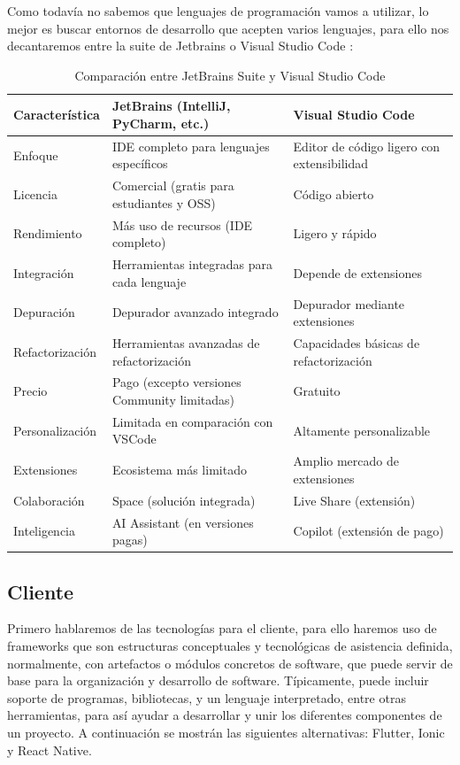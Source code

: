 Como todavía no sabemos que lenguajes de programación vamos a utilizar, lo mejor es buscar entornos de desarrollo que acepten varios lenguajes, para ello nos decantaremos entre la suite de Jetbrains \cite{jetbrains} o Visual Studio Code \cite{vscode}:

\begin{table}[H]
	\centering

	\begin{tabular}{|>{\raggedright}p{3cm}|p{4cm}|p{4cm}|} 
		\hline
		\textbf{Característica} & \textbf{JetBrains (IntelliJ, PyCharm, etc.)} & \textbf{Visual Studio Code} \\ \hline
		Enfoque & IDE completo para lenguajes específicos & Editor de código ligero con extensibilidad \\ \hline
		Licencia & Comercial (gratis para estudiantes y OSS) & Código abierto \\ \hline
		Rendimiento & Más uso de recursos (IDE completo) & Ligero y rápido \\ \hline
		Integración & Herramientas integradas para cada lenguaje & Depende de extensiones \\ \hline
		Depuración & Depurador avanzado integrado & Depurador mediante extensiones \\ \hline
		Refactorización & Herramientas avanzadas de refactorización & Capacidades básicas de refactorización \\ \hline
		Precio & Pago (excepto versiones Community limitadas) & Gratuito \\ \hline
		Personalización & Limitada en comparación con VSCode & Altamente personalizable \\ \hline
		Extensiones & Ecosistema más limitado & Amplio mercado de extensiones \\ \hline
		Colaboración & Space (solución integrada) & Live Share (extensión) \\ \hline
		Inteligencia & AI Assistant (en versiones pagas) & Copilot (extensión de pago) \\ \hline
	\end{tabular}
		\caption{Comparación entre JetBrains Suite y Visual Studio Code}
\end{table}


\subsection{Cliente}

Primero hablaremos de las tecnologías para el cliente, para ello haremos uso de frameworks \cite{framework} que son estructuras conceptuales y tecnológicas de asistencia definida, normalmente, con artefactos o módulos concretos de software, que puede servir de base para la organización y desarrollo de software. Típicamente, puede incluir soporte de programas, bibliotecas, y un lenguaje interpretado, entre otras herramientas, para así ayudar a desarrollar y unir los diferentes componentes de un proyecto. A continuación se mostrán las siguientes alternativas: Flutter, Ionic y React Native.

